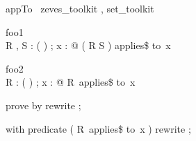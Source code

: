 \begin{zsection}	 \SECTION appTo \parents~zeves\_toolkit , set\_toolkit
\end{zsection}



\begin{theorem}{ foo1}\\
 \forall R , S : \power ( \nat \cross \nat ) ; x : \nat @ ( R \cup S ) applies\$ to~x \\

\end{theorem}



\begin{theorem}{ foo2}\\
 \forall R : \power ( \nat \cross \nat ) ; x : \nat @ R~applies\$ to~x \\

\end{theorem}



\begin{zproof}[foo2]

 prove by rewrite ;
 
 with predicate ( R~applies\$ to~x ) rewrite ;
 

\end{zproof}




